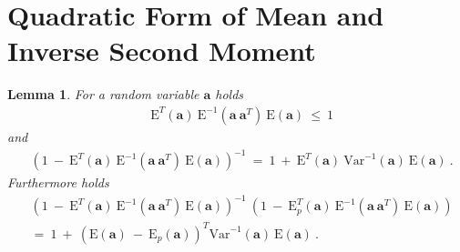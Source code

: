 \documentclass{article}
\newtheorem{lemma}{Lemma}
\newcommand\Ba{\bm{a}}
\newcommand\EXP{\mathbf{\mathrm{E}}}
\newcommand\VAR{\mathbf{\mathrm{Var}}}
\begin{document}
\section{Quadratic Form of Mean and Inverse Second Moment}
\label{sec:second}


\begin{lemma}
\label{th:lemma2}
For a random variable $\Ba$ holds
\begin{align}
&\EXP^T(\Ba) \ \EXP^{-1}(\Ba \ \Ba^T) \ \EXP(\Ba) \ \leq \ 1
\end{align}
and
\begin{align}
&\left( 1 \ - \ \EXP^T(\Ba) \ \EXP^{-1}(\Ba \ \Ba^T) \ \EXP(\Ba)
\right)^{-1} \ = \ 1 \ + \ \EXP^T(\Ba) \ \VAR^{-1}(\Ba) \ \EXP(\Ba) \ .
\end{align}
Furthermore holds
\begin{align}
&\left( 1 \ - \ \EXP^T(\Ba) \ \EXP^{-1}(\Ba \ \Ba^T) \ \EXP(\Ba)
\right)^{-1} \ \left(1 \ - \ \EXP_p^T(\Ba) \ \EXP^{-1}(\Ba \ \Ba^T) \ \EXP(\Ba)\right)
\\ \nonumber
&= \ 1 \ + \  \left( \EXP(\Ba) \ - \ \EXP_p(\Ba) \right)^T
\VAR^{-1}(\Ba) \ \EXP(\Ba) \ .
\end{align}
\end{lemma}
\end{document}
